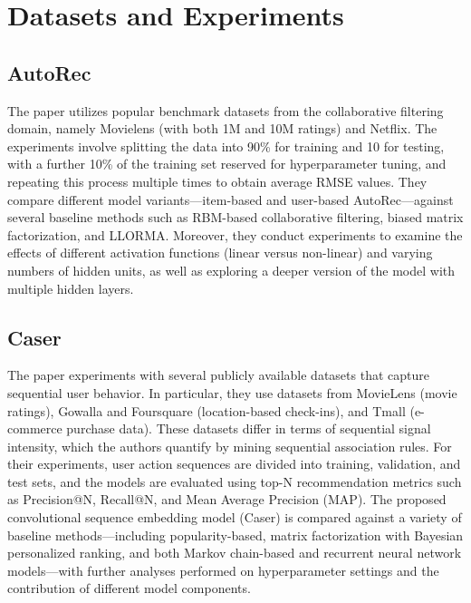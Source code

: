 \documentclass{ieeetj}
\begin{document}
\section{Datasets and Experiments}
\subsection{AutoRec\cite{sedhain2015autorec}}
The paper utilizes popular benchmark datasets from the collaborative filtering domain, namely Movielens (with both 1M and 10M ratings) and Netflix. The experiments involve splitting the data into 90\% for training and 10 for testing, with a further 10\% of the training set reserved for hyperparameter tuning, and repeating this process multiple times to obtain average RMSE values. They compare different model variants—item-based and user-based AutoRec—against several baseline methods such as RBM-based collaborative filtering, biased matrix factorization, and LLORMA. Moreover, they conduct experiments to examine the effects of different activation functions (linear versus non-linear) and varying numbers of hidden units, as well as exploring a deeper version of the model with multiple hidden layers.

\subsection{Caser\cite{tang2018personalized}}
The paper experiments with several publicly available datasets that capture sequential user behavior. In particular, they use datasets from MovieLens (movie ratings), Gowalla and Foursquare (location-based check-ins), and Tmall (e-commerce purchase data). These datasets differ in terms of sequential signal intensity, which the authors quantify by mining sequential association rules. For their experiments, user action sequences are divided into training, validation, and test sets, and the models are evaluated using top-N recommendation metrics such as Precision@N, Recall@N, and Mean Average Precision (MAP). The proposed convolutional sequence embedding model (Caser) is compared against a variety of baseline methods—including popularity-based, matrix factorization with Bayesian personalized ranking, and both Markov chain-based and recurrent neural network models—with further analyses performed on hyperparameter settings and the contribution of different model components.

\end{document}

